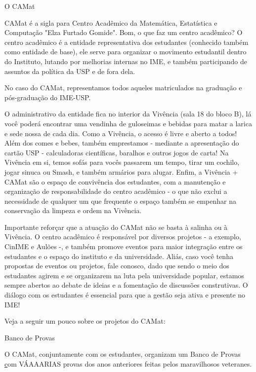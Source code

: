 \begin{secao}{O CAMat}

CAMat é a sigla para Centro Acadêmico da Matemática, Estatística e Computação 
"Elza Furtado Gomide". Bom, o que faz um centro acadêmico? 
O centro acadêmico é a entidade representativa dos estudantes (conhecido 
também como entidade de base), ele serve para organizar o movimento estudantil
dentro do Instituto, lutando por melhorias internas no IME, e também
participando de assuntos da política da USP e de fora dela.

No caso do CAMat, representamos todos aqueles matriculados na graduação e pós-graduação do IME-USP.

O administrativo da entidade fica no interior da Vivência (sala 18 do bloco B), lá você 
poderá encontrar uma vendinha de guloseimas e bebidas para matar a larica e sede nossa de
cada dia. Como a Vivência,  o acesso é livre e aberto a todos! Além dos
comes e bebes, também emprestamos - mediante a apresentação do cartão USP -
calculadoras científicas, baralhos e outros jogos de carta! Na Vivência em si, temos sofás
para vocês passarem um tempo, tirar um cochilo, jogar sinuca ou Smash, e
também armários para alugar. Enfim, a Vivência + CAMat são o espaço de convivência 
dos estudantes, com a manutenção e organização de responsabilidade do centro acadêmico 
- o que não exclui a necessidade de qualquer um que frequente o espaço também se 
empenhar na conservação da limpeza e ordem na Vivência.

Importante reforçar que a atuação do CAMat não se basta à salinha ou à Vivência. 
O centro acadêmico é responsável por diversos projetos - a exemplo, CinIME e Aulões 
-, e também promove eventos para maior integração entre os estudantes e o espaço do 
instituto e da universidade. Aliás, caso você tenha propostas de eventos ou projetos, 
fale conosco, dado que sendo o meio dos estudantes agirem e se organizarem na luta pela 
universidade popular, estamos sempre abertos ao debate de ideias e a fomentação de discussões 
construtivas. O diálogo com os estudantes é essencial para que a gestão seja ativa e presente no IME!

Veja a seguir um pouco sobre os projetos do CAMat:


\begin{subsecao}{Banco de Provas}

O CAMat, conjuntamente com os estudantes, organizam um Banco de Provas
\href{https://camat.ime.usp.br/apoio/} com VÁAAARIAS provas dos anos 
anteriores feitas pelos maravilhosos veteranes.


\end{subsecao}
\end{secao}
